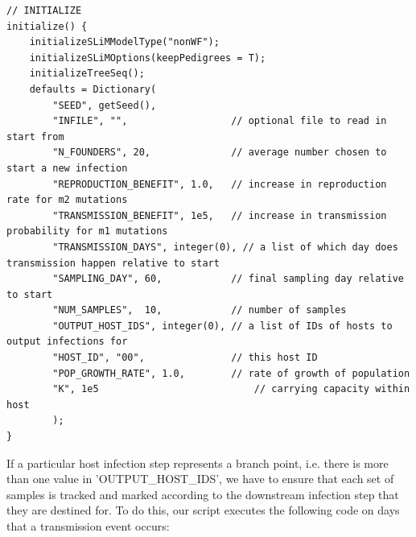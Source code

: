 \documentclass[12pt]{article}
\begin{document}
\begin{verbatim}
// INITIALIZE
initialize() {
	initializeSLiMModelType("nonWF");
	initializeSLiMOptions(keepPedigrees = T);
	initializeTreeSeq();
	defaults = Dictionary(
		"SEED", getSeed(),
		"INFILE", "",                  // optional file to read in start from
		"N_FOUNDERS", 20,              // average number chosen to start a new infection
		"REPRODUCTION_BENEFIT", 1.0,   // increase in reproduction rate for m2 mutations
		"TRANSMISSION_BENEFIT", 1e5,   // increase in transmission probability for m1 mutations
		"TRANSMISSION_DAYS", integer(0), // a list of which day does transmission happen relative to start
		"SAMPLING_DAY", 60,            // final sampling day relative to start
		"NUM_SAMPLES",  10,            // number of samples
		"OUTPUT_HOST_IDS", integer(0), // a list of IDs of hosts to output infections for
		"HOST_ID", "00",               // this host ID
		"POP_GROWTH_RATE", 1.0,        // rate of growth of population
		"K", 1e5     				       // carrying capacity within host
		);
}
\end{verbatim}

If a particular host infection step represents a branch point, i.e. there is more than one value in 'OUTPUT\_HOST\_IDS', we have to ensure that each set of samples is tracked
and marked according to the downstream infection step that they are destined for. To do this, our script executes the following code on days that a transmission event occurs:
\end{document}
